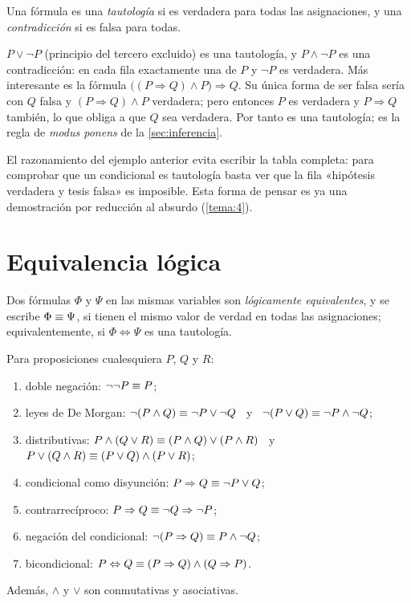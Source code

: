 \begin{definicion}
Una fórmula es una \emph{tautología} si es verdadera para todas las asignaciones, y una \emph{contradicción} si es falsa para todas.
\end{definicion}

\begin{ejemplo}\label{ej:tercero-excluido}
$P\vee\neg P$ (principio del tercero excluido) es una tautología, y $P\wedge\neg P$ es una contradicción: en cada fila exactamente una de $P$ y $\neg P$ es verdadera. Más interesante es la fórmula $\bigl((P\Rightarrow Q)\wedge P\bigr)\Rightarrow Q$. Su única forma de ser falsa sería con $Q$ falsa y $(P\Rightarrow Q)\wedge P$ verdadera; pero entonces $P$ es verdadera y $P\Rightarrow Q$ también, lo que obliga a que $Q$ sea verdadera. Por tanto es una tautología; es la regla de \emph{modus ponens} de la \cref{sec:inferencia}.
\end{ejemplo}

El razonamiento del ejemplo anterior evita escribir la tabla completa: para comprobar que un condicional es tautología basta ver que la fila «hipótesis verdadera y tesis falsa» es imposible. Esta forma de pensar es ya una demostración por reducción al absurdo (\cref{tema:4}).

\section{Equivalencia lógica}

\begin{definicion}\label{def:equivalencia}
Dos fórmulas $\Phi$ y $\Psi$ en las mismas variables son \emph{lógicamente equivalentes}, y se escribe $\Phi\equiv\Psi$, si tienen el mismo valor de verdad en todas las asignaciones; equivalentemente, si $\Phi\Leftrightarrow\Psi$ es una tautología.
\end{definicion}

\begin{proposicion}\label{prop:leyes}
Para proposiciones cualesquiera $P$, $Q$ y $R$:
\begin{enumerate}
  \item doble negación: $\neg\neg P\equiv P$;
  \item leyes de De Morgan: $\neg(P\wedge Q)\equiv\neg P\vee\neg Q$ \ y \ $\neg(P\vee Q)\equiv\neg P\wedge\neg Q$;
  \item distributivas: $P\wedge(Q\vee R)\equiv(P\wedge Q)\vee(P\wedge R)$ \ y \ $P\vee(Q\wedge R)\equiv(P\vee Q)\wedge(P\vee R)$;
  \item condicional como disyunción: $P\Rightarrow Q\equiv\neg P\vee Q$;
  \item contrarrecíproco: $P\Rightarrow Q\equiv\neg Q\Rightarrow\neg P$;
  \item negación del condicional: $\neg(P\Rightarrow Q)\equiv P\wedge\neg Q$;
  \item bicondicional: $P\Leftrightarrow Q\equiv(P\Rightarrow Q)\wedge(Q\Rightarrow P)$.
\end{enumerate}
Además, $\wedge$ y $\vee$ son conmutativas y asociativas.
\end{proposicion}

